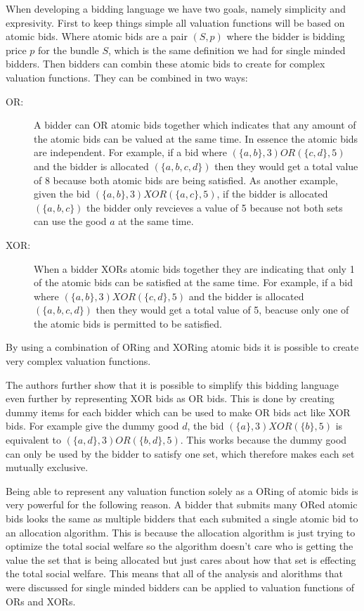\documentclass[10pt,onecolumn,letterpaper]{article}
\theoremstyle{definition}
\begin{document}
When developing a bidding language we have two goals, namely simplicity and expresivity. First to keep things simple all valuation functions will be based on atomic bids. Where atomic bids are a pair $(S,p)$ where the bidder is bidding price $p$ for the bundle $S$, which is the same definition we had for single minded bidders. Then bidders can combin these atomic bids to create for complex valuation functions. They can be combined in two ways:

\begin{description}
  \item [OR:] A bidder can OR atomic bids together which indicates that any amount of the atomic bids can be valued at the same time. In essence the atomic bids are independent. For example, if a bid where $(\{a,b\}, 3) OR (\{c,d\}, 5)$ and the bidder is allocated $(\{a,b,c,d\})$ then they would get a total value of 8 because both atomic bids are being satisfied. As another example, given the bid $(\{a,b\}, 3) XOR (\{a,c\}, 5)$, if the bidder is allocated $(\{a,b,c\})$ the bidder only revcieves a value of 5 because not both sets can use the good $a$ at the same time. 

  \item [XOR:] When a bidder XORs atomic bids together they are indicating that only 1 of the atomic bids can be satisfied at the same time. For example, if a bid where $(\{a,b\}, 3) XOR (\{c,d\}, 5)$ and the bidder is allocated $(\{a,b,c,d\})$ then they would get a total value of 5, beacuse only one of the atomic bids is permitted to be satisfied. 

\end{description}

By using a combination of ORing and XORing atomic bids it is possible to create very complex valuation functions. 

The authors further show that it is possible to simplify this bidding language even further by representing XOR bids as OR bids. This is done by creating dummy items for each bidder which can be used to make OR bids act like XOR bids. For example give the dummy good $d$, the bid $(\{a\}, 3) XOR (\{b\}, 5)$ is equivalent to $(\{a,d\}, 3) OR (\{b,d\}, 5)$. This works because the dummy good can only be used by the bidder to satisfy one set, which therefore makes each set mutually exclusive. 

Being able to represent any valuation function solely as a ORing of atomic bids is very powerful for the following reason. A bidder that submits many ORed atomic bids looks the same as multiple bidders that each submited a single atomic bid to an allocation algorithm. This is because the allocation algorithm is just trying to optimize the total social welfare so the algorithm doesn't care who is getting the value the set that is being allocated but just cares about how that set is effecting the total social welfare. This means that all of the analysis and alorithms that were discussed for single minded bidders can be applied to valuation functions of ORs and XORs. 
\end{document}

